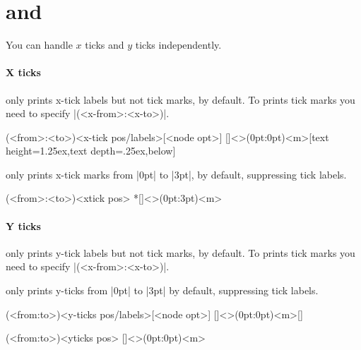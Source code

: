 \section{\protect\cmd{\tzticksx(*)} and \protect\cmd{\tzticksy(*)}}
\label{s:tzticksx}

You can handle $x$ ticks and $y$ ticks independently.

\paragraph{X ticks}

\icmd{\tzticksx} only prints x-tick labels but not tick marks, by default.
To prints tick marks you need to specify |(<x-from>:<x-to>)|.

\begin{tzdef}{}
(<from>:<to>){<x-tick pos/labels>}[<node opt>]
  []<>(0pt:0pt){<m>}[text height=1.25ex,text depth=.25ex,below]
\end{tzdef}


\icmd{\tzticksx*} only prints x-tick marks from |0pt| to |3pt|, by default, suppressing tick labels.

\begin{tzdef}{}
(<from>:<to>){<xtick pos>}
 *[]<>(0pt:3pt){<m>}
\end{tzdef}


\paragraph{Y ticks}

\icmd{\tzticksy} only prints y-tick labels but not tick marks, by default.
To prints tick marks you need to specify |(<x-from>:<x-to>)|.

\icmd{\tzticksy*} only prints y-ticks from |0pt| to |3pt| by default, suppressing tick labels.

\begin{tzdef}{}
(<from:to>){<y-ticks pos/labels>}[<node opt>]
  []<>(0pt:0pt){<m>}[]
\end{tzdef}

\begin{tzdef}{}
(<from:to>){<yticks pos>}
  []<>(0pt:0pt){<m>}
\end{tzdef}


